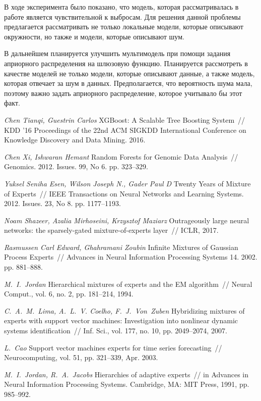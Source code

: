 \documentclass[12pt, twoside]{article}
\numberwithin{equation}{section}
\begin{document}
В ходе эксперимента было показано, что модель, которая рассматривалась в работе является чувствительной к выбросам. Для решения данной проблемы предлагается рассматривать не только локальные модели, которые описывают окружности, но также и модели, которые описывают шум. 

В дальнейшем планируется улучшить мультимодель при помощи задания априорного распределения на шлюзовую функцию. Планируется рассмотреть в качестве моделей не только модели, которые описывают данные, а также модель, которая отвечает за шум в данных. Предполагается, что вероятность шума мала, поэтому важно задать априорного распределение, которое учитывало бы этот факт.


\begin{thebibliography}{99}
	\textit{Chen Tianqi, Guestrin Carlos} XGBoost: A Scalable Tree Boosting System~// KDD ’16 Proceedings of the 22nd ACM SIGKDD International Conference on Knowledge Discovery and Data Mining. 2016.
	
	\textit{Chen Xi, Ishwaran Hemant} Random Forests for Genomic Data Analysis~// Genomics. 2012. Issues. 99, No 6. pp. 323--329.

	\textit{Yuksel Seniha Esen, Wilson Joseph N., Gader Paul D} Twenty Years of Mixture of Experts~// IEEE Transactions on Neural Networks and Learning Systems. 2012. Issues. 23, No 8. pp. 1177–1193.

	\textit{Noam Shazeer, Azalia Mirhoseini, Krzysztof Maziarz} Outrageously large neural networks: the sparsely-gated mixture-of-experts layer~// ICLR, 2017.

	\textit{Rasmussen Carl Edward, Ghahramani Zoubin} Infinite Mixtures of Gaussian Process Experts~// Advances in Neural Information Processing Systems 14. 2002. pp. 881–888.
	
	\textit{M.~I.~Jordan} Hierarchical mixtures of experts and the EM algorithm~// Neural Comput., vol. 6, no. 2, pp. 181–214, 1994.
	
	\textit{C.~A.~M.~Lima, A.~L.~V. Coelho, F.~J.~Von~Zuben} Hybridizing mixtures of experts with support vector machines: Investigation into nonlinear dynamic systems identification~// Inf. Sci., vol. 177, no. 10, pp. 2049–2074, 2007.

	\textit{L.~Cao} Support vector machines experts for time series forecasting~// Neurocomputing, vol. 51, pp. 321–339, Apr. 2003.
	
	\textit{M.~I.~Jordan, R.~A.~Jacobs} Hierarchies of adaptive experts~// in Advances in Neural Information Processing Systems. Cambridge, MA: MIT Press, 1991, pp. 985–992.

 \end{thebibliography}
\end{document}
